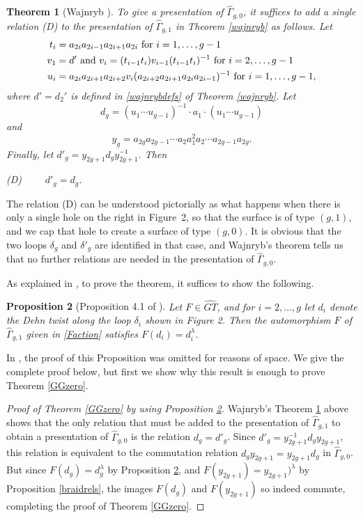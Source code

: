 \documentclass[a4paper,10pt,reqno]{amsart}
\newcommand\GT{\widehat{GT}}
\newcommand\GGone{\widehat{\Gamma}_{g,1}}
\newcommand\GGzero{\widehat{\Gamma}_{g,0}}
\newtheorem{thm}{Theorem}[section]
\newtheorem{prop}[thm]{Proposition}
\begin{document}
\begin{thm}[Wajnryb \cite{W}] 
\label{wajnryb-ii}
To give a presentation of $\widehat\Gamma_{g,0}$, it suffices to add a single
relation (D) to the presentation of $\GGone$ in Theorem \ref{wajnryb} as follows. 
Let 
\begin{align*}t_i&=a_{2i}a_{2i-1}a_{2i+1}a_{2i}\hbox{ for }i=1,\ldots,g-1\\
v_1&=d'\hbox{ and }v_i=(t_{i-1}t_i)v_{i-1}(t_{i-1}t_i)^{-1}\hbox{ for }i=2,\ldots,g-1\\
u_i&=a_{2i}a_{2i+1}a_{2i+2}v_i(a_{2i+2}a_{2i+1}a_{2i}a_{2i-1})^{-1}\hbox{ for }i=1,\ldots,g-1,
\end{align*}
where $d'=d_2'$ is defined in \eqref{wajnrybdefs} of Theorem 
\ref{wajnryb}.
Let 
$$d_g=(u_1\cdots u_{g-1})^{-1}\cdot a_1\cdot (u_1\cdots u_{g-1})$$
and
$$y_g=a_{2g}a_{2g-1}\cdots a_2a_1^2a_2\cdots a_{2g-1}a_{2g}.$$
Finally, let $d'_g=y_{2g+1}d_gy_{2g+1}^{-1}$. Then

\vspace{.1cm}\noindent
(D) \ \ \ \ $d'_g=d_g$.
\end{thm}

\vspace{.1cm}
The relation (D) can be understood pictorially as what happens when there
is only a single hole on the right in Figure~2, so that the surface is of
type $(g,1)$, and we cap that hole to create a surface of type $(g,0)$. 
It is obvious that the two loops $\delta_g$ and $\delta'_g$ are identified
in that case, and Wajnryb's theorem tells us that no further relations are
needed in the presentation of $\GGzero$.

\vspace{.1cm}
As explained in \cite[Sect. 4]{LNS}, to prove the theorem, it suffices to show
the following.

\begin{prop}[Proposition 4.1 of \cite{LNS}]
\label{F(di)=di}
Let $F\in\GT$, and for $i=2,\ldots,g$ let $d_i$ denote the Dehn twist along the loop $\delta_i$ shown in
Figure 2. Then the automorphism $F$ of $\GGone$ given in \eqref{Faction} satisfies $F(d_i)=d_i^\lambda$.
\end{prop}

\noindent
In \cite{LNS}, the proof of this Proposition was omitted for reasons of
space. We give the complete proof below, but first we show why this
result is enough to prove Theorem \ref{GGzero}. 

\begin{proof}[Proof of Theorem \ref{GGzero} by using Proposition \ref{F(di)=di}]
Wajnryb's Theorem \ref{wajnryb-ii} above shows that the only relation that 
must be added to the presentation of $\GGone$ to obtain a presentation of 
$\GGzero$ is the relation $d_g=d'_g$. Since $d'_g=y_{2g+1}^{-1}d_gy_{2g+1}$, 
this relation is equivalent to the commutation relation $d_gy_{2g+1}=
y_{2g+1}d_g$ in $\GGzero$. But since $F(d_g)=d_g^\lambda$ by Proposition 
\ref{F(di)=di}, and $F(y_{2g+1})=y_{2g+1})^\lambda$ 
by Proposition \ref{braidrels}, the images $F(d_g)$ and $F(y_{2g+1})$ so
indeed commute, completing the proof of Theorem \ref{GGzero}.
\end{proof}
\end{document}
